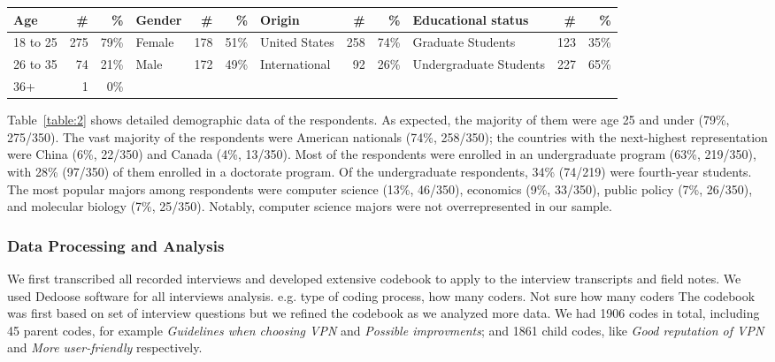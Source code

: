 \begin{table*}[h!]
\centering
\begin{tabular}{l r r |l r r|l r r|l r r} 
 \hline
 Age & \# & \% & Gender & \# & \% & Origin & \# & \% & Educational status & \# & \% \\
\hline
18 to 25 & 275 & 79\% & Female & 178 & 51\% & United States & 258 & 74\% & Graduate Students & 123 & 35\% \\
26 to 35 & 74 & 21\% & Male & 172 & 49\% & International & 92 & 26\% & Undergraduate Students & 227 & 65\% \\
36+ & 1 & 0\% & & & & & & & & & \\
 \hline
\end{tabular}
\caption{The distribution over age, gender, origin and education status for 350 survey participants, at the time of collecting the data. Our 92 International participants came from 32 different countries.}
\label{table:2}
\end{table*}

Table~\ref{table:2} shows detailed demographic data of the respondents. As expected, the
majority of them were age 25 and under (79\%, 275/350). The vast majority of
the respondents were American nationals (74\%, 258/350); the countries with
the next-highest representation were China (6\%, 22/350) and Canada (4\%,
13/350). Most of the respondents were enrolled in an undergraduate
program (63\%, 219/350), with 28\% (97/350) of them enrolled in a doctorate
program. Of the undergraduate respondents, 34\% (74/219) were fourth-year
students. The most popular majors among respondents were computer science
(13\%, 46/350), economics (9\%, 33/350), public policy (7\%, 26/350), and
molecular biology (7\%, 25/350). Notably, computer science majors were not
overrepresented in our sample.




\subsubsection{Data Processing and Analysis} 

We first transcribed all recorded interviews and developed extensive codebook
to apply to the interview transcripts and field notes. We used Dedoose
software for all interviews analysis.   e.g. type of coding process, how many coders.
Not sure how many coders The codebook was first based on set of interview
questions but we refined the codebook as we analyzed more data. We had 1906
codes in total, including 45 parent codes, for example \textit{Guidelines when
choosing VPN} and \textit{Possible improvments}; and 1861 child codes, like
\textit{Good reputation of VPN} and \textit{More user-friendly} respectively.

